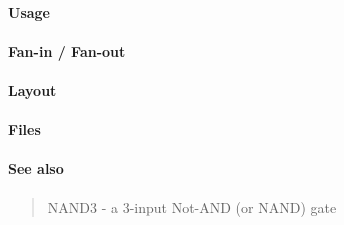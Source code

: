 \paragraph{Usage}

\paragraph{Fan-in / Fan-out}

\paragraph{Layout}

\paragraph{Files}

\paragraph{See also}
\begin{quote}
    NAND3 - a 3-input Not-AND (or NAND) gate
\end{quote}
